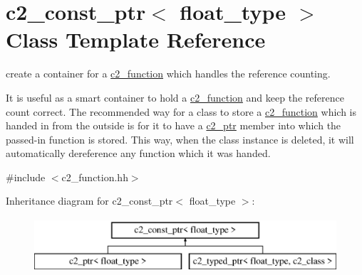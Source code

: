 \hypertarget{classc2__const__ptr}{\section{c2\-\_\-const\-\_\-ptr$<$ float\-\_\-type $>$ Class Template Reference}
\label{classc2__const__ptr}
}


create a container for a \hyperlink{classc2__function}{c2\-\_\-function} which handles the reference counting.

It is useful as a smart container to hold a \hyperlink{classc2__function}{c2\-\_\-function} and keep the reference count correct. The recommended way for a class to store a \hyperlink{classc2__function}{c2\-\_\-function} which is handed in from the outside is for it to have a \hyperlink{classc2__ptr}{c2\-\_\-ptr} member into which the passed-\/in function is stored. This way, when the class instance is deleted, it will automatically dereference any function which it was handed.  




{\ttfamily \#include $<$c2\-\_\-function.\-hh$>$}

Inheritance diagram for c2\-\_\-const\-\_\-ptr$<$ float\-\_\-type $>$\-:\begin{figure}[H]
\begin{center}
\leavevmode
\includegraphics[height=2.000000cm]{classc2__const__ptr}
\end{center}
\end{figure}

